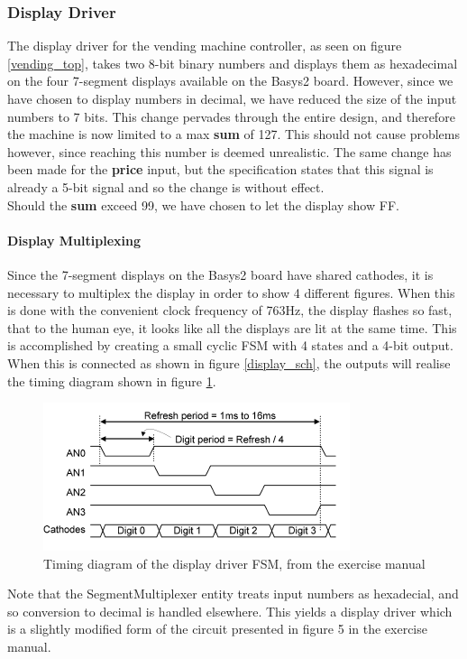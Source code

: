 \subsubsection{Display Driver}
The display driver for the vending machine controller, as seen on figure \ref{vending_top}, takes two 8-bit binary numbers
and displays them as hexadecimal on the four 7-segment displays available on the Basys2 board.
However, since we have chosen to display numbers in decimal, we have reduced the size of the input numbers to 7 bits.
This change pervades through the entire design, and therefore the machine is now limited to a max \textbf{sum} of 127.
This should not cause problems however, since reaching this number is deemed unrealistic.
The same change has been made for the \textbf{price} input, but the specification states that this signal is already a 5-bit signal and so the change is without effect. \\
Should the \textbf{sum} exceed 99, we have chosen to let the display show FF.

\paragraph{Display Multiplexing}
Since the 7-segment displays on the Basys2 board have shared cathodes, it is necessary to multiplex the display in order to show 4 different figures.
When this is done with the convenient clock frequency of 763Hz, the display flashes so fast,
that to the human eye, it looks like all the displays are lit at the same time.
This is accomplished by creating a small cyclic FSM with 4 states and a 4-bit output. When this is connected as shown in figure \ref{display_sch},
the outputs will realise the timing diagram shown in figure \ref{display_timing}.
\begin{figure}
    \center
    \includegraphics{pictures/display_timing.png}
    \caption{Timing diagram of the display driver FSM, from the exercise manual}
    \label{display_timing}
\end{figure}

Note that the SegmentMultiplexer entity treats input numbers as hexadecial, and so conversion to decimal is handled elsewhere.
This yields a display driver which is a slightly modified form of the circuit presented in figure 5 in the exercise manual.

